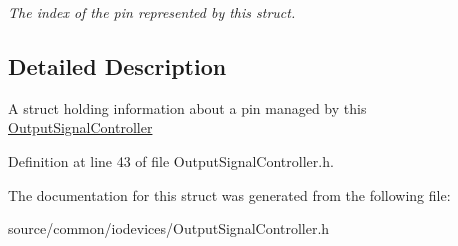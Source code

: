 \begin{DoxyCompactItemize}
\begin{DoxyCompactList}\small\item\em The index of the pin represented by this struct. \end{DoxyCompactList}\end{DoxyCompactItemize}


\subsection{Detailed Description}
A struct holding information about a pin managed by this \hyperlink{class_picto_1_1_output_signal_controller}{Output\-Signal\-Controller} 

Definition at line 43 of file Output\-Signal\-Controller.\-h.



The documentation for this struct was generated from the following file\-:\begin{DoxyCompactItemize}
\item 
source/common/iodevices/Output\-Signal\-Controller.\-h\end{DoxyCompactItemize}

